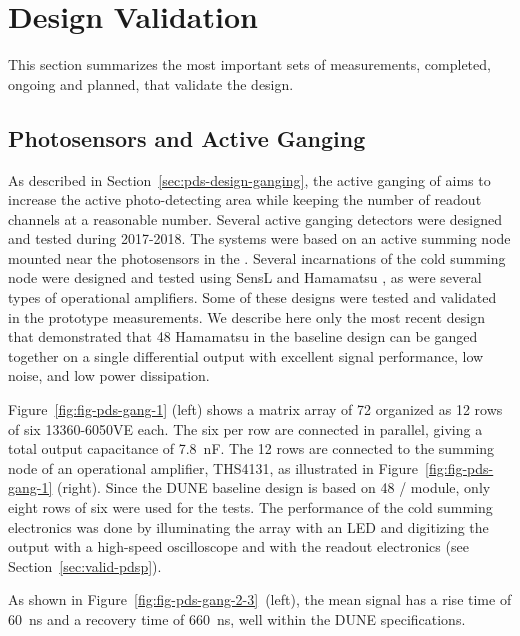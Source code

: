\section{Design Validation}
\label{sec:fdsp-pd-validation}


This section summarizes the most important sets of measurements, completed, ongoing and planned, that validate the  design. 


\subsection{Photosensors and Active Ganging}
\label{sec:pds-valid-ganging}

As described in Section~\ref{sec:pds-design-ganging}, the active ganging of  aims to increase the active photo-detecting area while keeping the number of readout channels at a reasonable number. 
Several active ganging detectors were designed and tested during 2017-2018. 
The systems were based on an active summing node mounted near the photosensors in the \lar. Several incarnations of the cold summing node were designed and tested using SensL and Hamamatsu , 
as were several types of operational amplifiers.
Some of these designs were tested and validated in the  prototype measurements.
We describe here only the most recent design that demonstrated that 48 Hamamatsu  in the baseline design can be ganged together on a single differential output with excellent signal performance, low noise, and low power dissipation.

Figure~\ref{fig:fig-pds-gang-1} (left) shows a matrix array of 72  organized as 12 rows of six  13360-6050VE  each. 
The six  per row are connected in parallel, giving a total output capacitance of \SI{7.8}{nF}. The 12 rows are connected to the summing node of an operational amplifier, THS4131, as illustrated in Figure~\ref{fig:fig-pds-gang-1} (right). 
Since the DUNE baseline design is based on 48 / module, only eight rows of six were used for the tests. 
The performance of the cold summing electronics was done by illuminating the  array with an LED and digitizing the output with a high-speed oscilloscope and with the  readout electronics (see 
Section~\ref{sec:valid-pdsp}).

As shown in Figure~\ref{fig:fig-pds-gang-2-3}~(left), the mean signal has a rise time of \SI{60}{ns} and a recovery time of \SI{660}{ns}, well within the DUNE  specifications.

